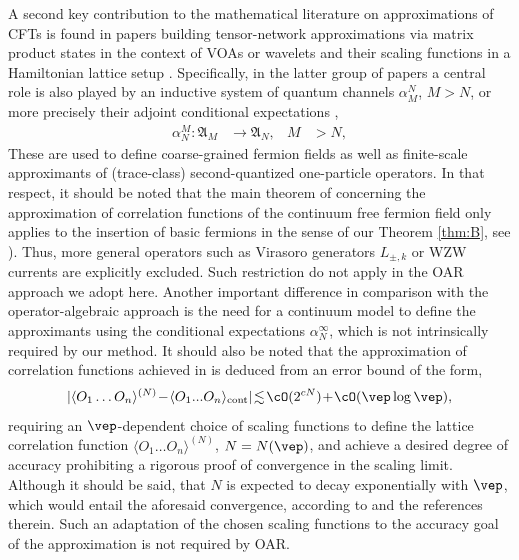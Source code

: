 \documentclass[a4paper, 11pt]{article}
\newcommand{\fA}{\mathfrak{A}}\newcommand{\cA}{\mathcal{A}}\newcommand{\dA}{\mathds{A}}\newcommand{\sA}{\mathscr{A}}
\DeclareMathOperator{\1}{\mathds{1}}
\begin{document}
\bigskip

A second key contribution to the mathematical literature on approximations of CFTs is found in papers building tensor-network approximations via matrix product states \cite{KoenigMatrixProductApproximations1, KoenigMatrixProductApproximations2} in the context of VOAs or wavelets and their scaling functions in a Hamiltonian lattice setup \cite{EvenblyEntanglementRenormalizationAnd, HaegemanRigorousFreeFermion, WitteveenQuantumCircuitApproximations}. Specifically, in the latter group of papers a central role is also played by an inductive system of quantum channels $\alpha^{N}_{M}$, $M>N$, or more precisely their adjoint conditional expectations \cite{EvansCompletelyPositiveQuasi},
\begin{align*}
\alpha^{M}_{N} : \fA_{M} & \longrightarrow \fA_{N}, & M & >N,
\end{align*}
These are used to define coarse-grained fermion fields as well as finite-scale approximants of (trace-class) second-quantized one-particle operators. In that respect, it should be noted that the main theorem of \cite{WitteveenQuantumCircuitApproximations} concerning the approximation of correlation functions of the continuum free fermion field only applies to the insertion of basic fermions in the sense of our Theorem \ref{thm:B}, see \cite[Theorem 4.4, p.~31]{WitteveenQuantumCircuitApproximations}). Thus, more general operators such as Virasoro generators $L_{\pm,k}$ or WZW currents are explicitly excluded. Such restriction do not apply in the OAR approach we adopt here. Another important difference in comparison with the operator-algebraic approach is the need for a continuum model to define the approximants using the conditional expectations $\alpha^{\infty}_{N}$, which is not intrinsically required by our method. It should also be noted that the approximation of correlation functions achieved in \cite{HaegemanRigorousFreeFermion, WitteveenQuantumCircuitApproximations} is deduced from an error bound of the form,
\begin{align*}
|\langle O_{1}\ldots O_{n}\rangle^{(N)}\!-\!\langle O_{1}...O_{n}\rangle_{\text{cont}}|\!\lesssim\!\cO(2^{c N})\!+\!\cO(\vep\log\vep),
\end{align*}
requiring an $\vep$-dependent choice of scaling functions to define the lattice correlation function $\langle O_{1}\dots O_{n}\rangle^{(N)}$, $N = N(\vep)$, and achieve a desired degree of accuracy prohibiting a rigorous proof of convergence in the scaling limit. Although it should be said, that $N$ is expected to decay exponentially with $\vep$, which would entail the aforesaid convergence, according to \cite{WitteveenQuantumCircuitApproximations} and the references therein. Such an adaptation of the chosen scaling functions to the accuracy goal of the approximation is not required by OAR.\\
\end{document}
